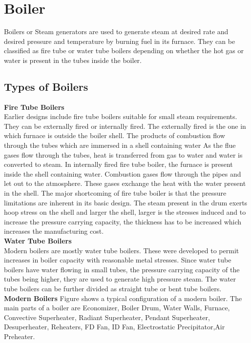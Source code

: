 \documentclass[english,11pt]{report}
\begin{document}
\chapter{Boiler}
Boilers or Steam generators are used to generate steam at desired rate and desired pressure
and temperature by burning fuel in its furnace. They can be classified as fire tube or water tube
boilers depending on whether the hot gas or water is present in the tubes inside the boiler.\\

\section{Types of Boilers}
\textbf{Fire Tube Boilers}\\
Earlier designs include fire tube boilers suitable for small steam requirements. They can be
externally fired or internally fired. The externally fired is the one in which furnace is outside the boiler shell. The products of combustion flow through the tubes which are immersed in a shell
containing water As the flue gases flow through the tubes, heat is transferred from gas to water
and water is converted to steam. In internally fired fire tube boiler, the furnace is present inside the shell containing water. Combustion gases flow through the pipes and let out to the
atmosphere. These gases exchange the heat with the water present in the shell. The major
shortcoming of fire tube boiler is that the pressure limitations are inherent in its basic design.
The steam present in the drum exerts hoop stress on the shell and larger the shell, larger is the
stresses induced and to increase the pressure carrying capacity, the thickness has to be
increased which increases the manufacturing cost.\\[1em]
\textbf{Water Tube Boilers}\\
Modern boilers are mostly water tube boilers. These were developed to permit increases in
boiler capacity with reasonable metal stresses. Since water tube boilers have water flowing in
small tubes, the pressure carrying capacity of the tubes being higher, they are used to generate
high pressure steam. The water tube boilers can be further divided as straight tube or bent tube
boilers.\\
\textbf{Modern Boilers}
Figure shows a typical configuration of a modern boiler. The main parts of a boiler are Economizer, Boiler Drum, Water Walls, Furnace, Convective Superheater, Radiant Superheater, Pendant Superheater, Desuperheater, Reheaters, FD Fan, ID Fan, Electrostatic Precipitator,Air Preheater.\\
\end{document}
